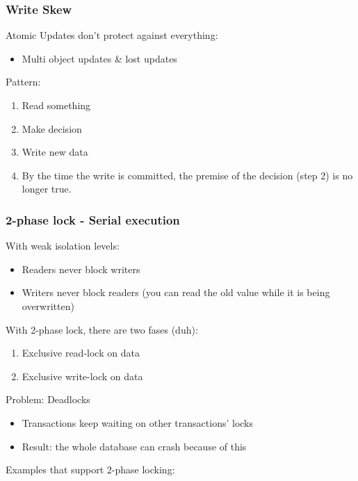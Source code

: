 \documentclass{article}
\begin{document}
\subsubsection{Write Skew}

Atomic Updates don't protect against everything:

\begin{itemize}
    \item Multi object updates \& lost updates
\end{itemize}

Pattern:

\begin{enumerate}
    \item Read something
    \item Make decision
    \item Write new data
    \item By the time the write is committed, the premise of the decision (step 2) is no longer true.
\end{enumerate}

\subsubsection{2-phase lock - Serial execution}

With weak isolation levels:

\begin{itemize}
    \item Readers never block writers
    \item Writers never block readers (you can read the old value while it is being overwritten)
\end{itemize}

With 2-phase lock, there are two fases (duh):

\begin{enumerate}
    \item Exclusive read-lock on data
    \item Exclusive write-lock on data
\end{enumerate}

Problem: Deadlocks

\begin{itemize}
    \item Transactions keep waiting on other transactions' locks
    \item Result: the whole database can crash because of this
\end{itemize}

Examples that support 2-phase locking:
\end{document}
